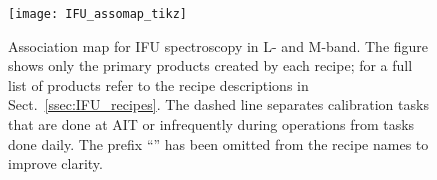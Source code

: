 \begin{landscape}
\begin{figure}[ht]
  \centering
  \texttt{[image: IFU\_assomap\_tikz]}
  \caption[Reduction cascade and association map for IFU spectroscopy]{%
    Association map for \ac{IFU} spectroscopy in L- and M-band. The
    figure shows only the primary products created by each recipe; for
    a full list of products refer to the recipe descriptions in
    Sect.~\ref{ssec:IFU_recipes}. The dashed line separates
    calibration tasks that are done at AIT or infrequently during
    operations from tasks done daily. The prefix ``'' has been
    omitted from the recipe names to improve clarity.}
  \label{Fig:IfuAssomap}
\end{figure}
\end{landscape}




